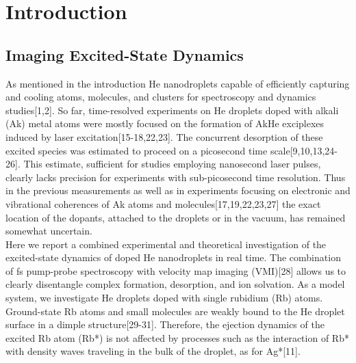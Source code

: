 \chapter{Introduction}
	\section{Imaging Excited-State Dynamics}
		As mentioned in the introduction He nanodroplets capable of efficiently capturing and cooling atoms, molecules, and clusters for spectroscopy and dynamics studies[1,2]. So far, time-resolved experiments on He droplets doped with alkali (Ak) metal atoms were mostly focused on the formation of AkHe exciplexes induced by laser excitation[15-18,22,23]. The concurrent desorption of these excited species was estimated to proceed on a picosecond time scale[9,10,13,24-26]. This estimate, sufficient for studies employing nanosecond laser pulses, clearly lacks precision for experiments with sub-picosecond time resolution. Thus in the previous measurements as well as in experiments focusing on electronic and vibrational coherences of Ak atoms and molecules[17,19,22,23,27] the exact location of the dopants, attached to the droplets or in the vacuum, has remained somewhat uncertain.\\

		Here we report a combined experimental and theoretical investigation of the excited-state dynamics of doped He nanodroplets in real time. The combination of fs pump-probe spectroscopy with velocity map imaging (VMI)[28] allows us to clearly disentangle complex formation, desorption, and ion solvation. As a model system, we investigate He droplets doped with single rubidium (Rb) atoms. Ground-state Rb atoms and small molecules are weakly bound to the He droplet surface in a dimple structure[29-31]. Therefore, the ejection dynamics of the excited Rb atom (Rb*) is not affected by processes such as the interaction of Rb* with density waves traveling in the bulk of the droplet, as for Ag*[11].

